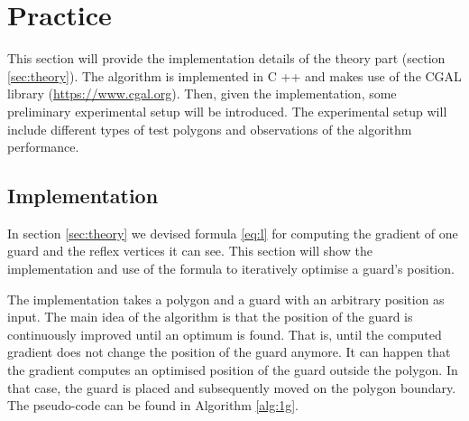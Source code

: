 \section{Practice}
\label{sec:experiments}

This section will provide the implementation details of the theory part (section \ref{sec:theory}). The algorithm is implemented in C ++ and makes use of the CGAL library (\url{https://www.cgal.org}). Then, given the implementation, some preliminary experimental setup will be introduced. The experimental setup will include different types of test polygons and observations of the algorithm performance.
\subsection{Implementation}
In section \ref{sec:theory} we devised formula \ref{eq:l} for computing the gradient of one guard and the reflex vertices it can see. This section will show the implementation and use of the formula to iteratively optimise a guard's position. 

The implementation takes a polygon and a guard with an arbitrary position as input. The main idea of the algorithm is that the position of the guard is continuously improved until an optimum is found. That is, until the computed gradient does not change the position of the guard anymore.
It can happen that the gradient computes an optimised position of the guard outside the polygon. In that case, the guard is placed and subsequently moved on the polygon boundary. The pseudo-code can be found in Algorithm \ref{alg:1g}.

